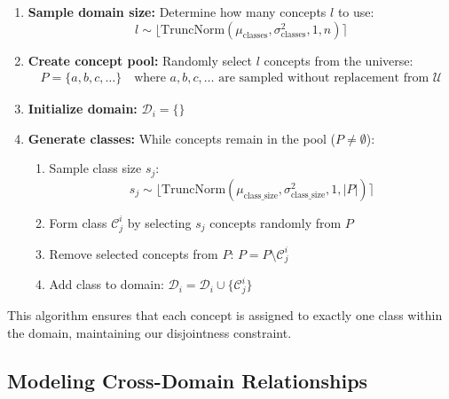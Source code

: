 \begin{enumerate}
    \item \textbf{Sample domain size:} Determine how many concepts $l$ to use:
          \begin{equation*}
              l \sim \lfloor\text{TruncNorm}(\mu_{\text{classes}}, \sigma^2_{\text{classes}}, 1, n)\rceil
          \end{equation*}

    \item \textbf{Create concept pool:} Randomly select $l$ concepts from the universe:
          \begin{align*}
              P = \{a, b, c, \ldots\} \quad \text{where } a, b, c, \ldots \text{ are sampled without replacement from } \mathcal{U}
          \end{align*}

    \item \textbf{Initialize domain:} $\mathcal{D}_i = \{\}$

    \item \textbf{Generate classes:} While concepts remain in the pool ($P \neq \emptyset$):
          \begin{enumerate}
              \item Sample class size $s_j$:
                    \begin{equation*}
                        s_j \sim \lfloor\text{TruncNorm}(\mu_{\text{class\_size}}, \sigma^2_{\text{class\_size}}, 1, |P|)\rceil
                    \end{equation*}

              \item Form class $\mathcal{C}_j^i$ by selecting $s_j$ concepts randomly from $P$

              \item Remove selected concepts from $P$: $P = P \setminus \mathcal{C}_j^i$

              \item Add class to domain: $\mathcal{D}_i = \mathcal{D}_i \cup \{\mathcal{C}_j^i\}$
          \end{enumerate}
\end{enumerate}

This algorithm ensures that each concept is assigned to exactly one class within the domain, maintaining our disjointness constraint.

\subsection{Modeling Cross-Domain Relationships}

